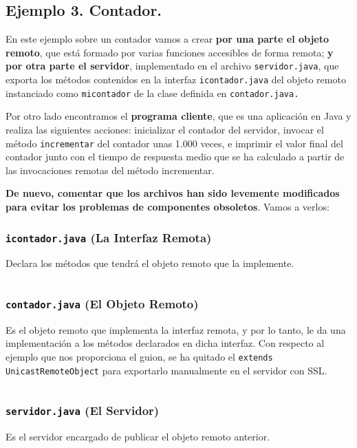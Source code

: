 \documentclass[a4paper,12pt]{article}
\begin{document}
		\subsection{Ejemplo 3. Contador.}
			En este ejemplo sobre un contador vamos a crear \textbf{por una parte el objeto remoto}, que está formado por varias funciones accesibles de forma remota; \textbf{y por otra parte el servidor}, implementado en el archivo \texttt{servidor.java}, que exporta los métodos contenidos en la interfaz \texttt{icontador.java} del objeto remoto instanciado como \texttt{micontador} de la clase definida en \texttt{contador.java. }
			
			Por otro lado encontramos el \textbf{programa cliente}, que es una aplicación en Java  y realiza las siguientes acciones: inicializar el contador del servidor, invocar el método \texttt{incrementar} del contador unas 1.000 veces, e imprimir el valor final del contador  junto con el tiempo de respuesta medio que se ha calculado a partir de las invocaciones remotas del método incrementar.
			
			\textbf{De nuevo, comentar que los archivos han sido levemente modificados para evitar los problemas de componentes obsoletos}. Vamos a verlos:
			
			\subsubsection{\texttt{icontador.java} (La Interfaz Remota)}
				Declara los métodos que tendrá el objeto remoto que la implemente.
				
				\inputminted[linenos, frame=lines, fontsize=\footnotesize]{Java}{../codigo/Parte_1_Implementacion_de_Ejemplos/Ejemplo_3/icontador.java}
				
			\subsubsection{\texttt{contador.java} (El Objeto Remoto)}
				Es el objeto remoto que implementa la interfaz remota, y por lo tanto, le da una implementación a los métodos declarados en dicha interfaz. Con respecto al ejemplo que nos proporciona el guion, se ha quitado el \texttt{extends UnicastRemoteObject} para exportarlo manualmente en el servidor con SSL.
				
				\inputminted[linenos, frame=lines, fontsize=\footnotesize]{Java}{../codigo/Parte_1_Implementacion_de_Ejemplos/Ejemplo_3/contador.java}
			
			\subsubsection{\texttt{servidor.java} (El Servidor)}
				Es el servidor encargado de publicar el objeto remoto anterior.
				
\end{document}
